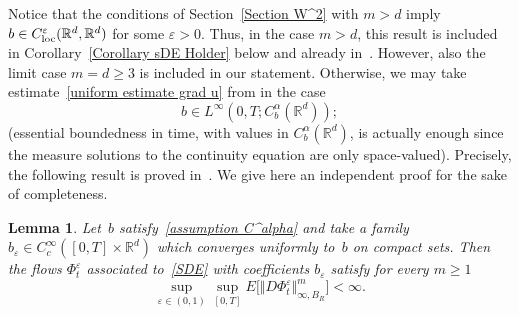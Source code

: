 \documentclass[a4paper,10pt]{article}
\newtheorem{lemma}[theorem]{Lemma}
\newcommand\1{\mathbbm{1}}
\newcommand{\eps}{\varepsilon}
\newcommand\loc{{\rm loc}}
\numberwithin{equation}{section}
\begin{document}
Notice that the conditions of Section~\ref{Section W^2} with $m>d$ imply $b\in C_{\loc}^{\varepsilon}(\mathbb{R}^{d},\mathbb{R}^{d})$ for some $\varepsilon>0$. Thus, in the case $m>d$, this result is included in Corollary~\ref{Corollary sDE Holder} below and already in~\cite{DAVIE07}. However, also the limit case $m=d\geq3$ is included in our statement. Otherwise, we may take estimate~\eqref{uniform estimate grad u} from
\cite{FLAGUBPRI10} in the case
\begin{equation}
b\in L^{\infty}(0,T;C_{b}^{\alpha}(\mathbb{R}^{d}));  \label{assumption C^alpha} 
\end{equation}
(essential boundedness in time, with values in $C_{b}^{\alpha}(\mathbb{R}^{d})$, is actually enough since the measure solutions to the continuity equation are only space-valued). Precisely, the following result is proved in~\cite{FLAGUBPRI10}. We give here an independent proof for the sake of completeness.

\begin{lemma}
\label{lemma_exp_flow}
Let~$b$ satisfy~\eqref{assumption C^alpha} and take a family $b_{\eps}\in C_{c}^{\infty}([0,T] \times\mathbb{R}^{d})$ which converges uniformly to~$b$ on compact sets. Then the flows $\Phi^{\eps}_t$ associated to~\eqref{SDE} with coefficients $b_{\eps}$ satisfy for every $m\geq 1$
\begin{equation}
\sup_{\eps\in (0,1)  }\sup_{[0,T]  }E\Big[ \Vert D\Phi^{\eps}_t \Vert_{\infty,B_R
}^{m} \Big]  <\infty .\label{flow estimate} 
\end{equation}
\end{lemma}
\end{document}
